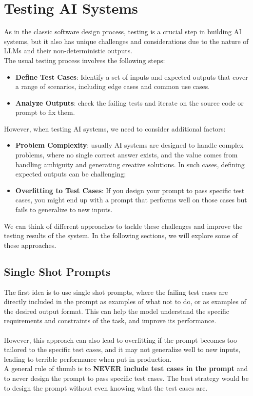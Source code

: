 \section{Testing AI Systems}
As in the classic software design process, testing is a crucial step in building AI systems, 
but it also has unique challenges and considerations due to the nature of LLMs and their non-deterministic outputs.
\\
The usual testing process involves the following steps:
\begin{itemize}
    \item \textbf{Define Test Cases}: Identify a set of inputs and expected outputs that cover a range of scenarios, including edge cases and common use cases.
    \item \textbf{Analyze Outputs}: check the failing tests and iterate on the source code or prompt to fix them.
\end{itemize}
However, when testing AI systems, we need to consider additional factors:
\begin{itemize}
    \item \textbf{Problem Complexity}: usually AI systems are designed to handle complex problems, where no
    single correct answer exists, and the value comes from handling ambiguity and generating creative solutions.
    In such cases, defining expected outputs can be challenging;
    \item \textbf{Overfitting to Test Cases}: If you design your prompt to pass specific test cases, 
    you might end up with a prompt that performs well on those cases but fails to generalize to new inputs.
\end{itemize}
We can think of different approaches to tackle these challenges and improve the testing results of the system. 
In the following sections, we will explore some of these approaches.

\subsection{Single Shot Prompts}
The first idea is to use single shot prompts, where the failing test cases are directly included in the prompt as examples of what not to do, or as examples of the desired output format.
This can help the model understand the specific requirements and constraints of the task, and improve its performance.
\\\\
However, this approach can also lead to overfitting if the prompt becomes too tailored to the specific test cases, and it may not generalize well to new inputs, leading
to terrible performance when put in production.
\\
A general rule of thumb is to \textbf{NEVER include test cases in the prompt} and to never design the prompt to pass specific test cases. 
The best strategy would be to design the prompt without even knowing what the test cases are.

